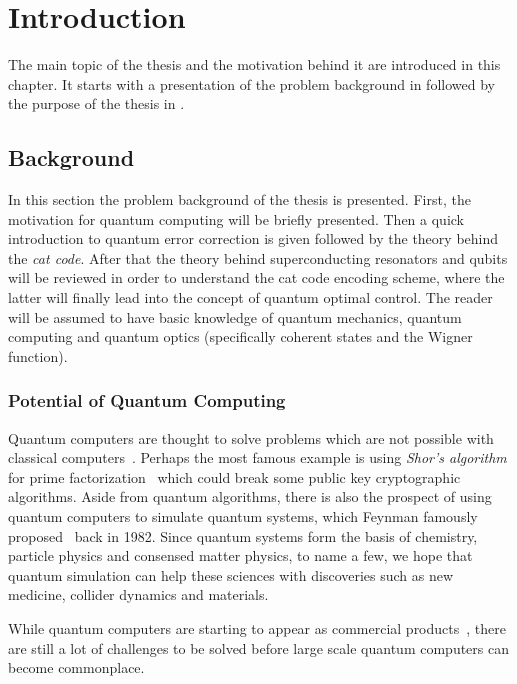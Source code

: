 \documentclass[main.tex]{subfiles}
\begin{document}
\chapter{Introduction}
The main topic of the thesis and the motivation behind it are introduced in this chapter.
It starts with a presentation of the problem background in  followed by the purpose of the thesis in .

\section{Background}%
\label{sec:background}
In this section the problem background of the thesis is presented.
First, the motivation for quantum computing will be briefly presented.
Then a quick introduction to quantum error correction is given followed by the theory behind the \emph{cat code}.
After that the theory behind superconducting resonators and qubits will be reviewed in order to understand the cat code encoding scheme, where the latter will finally lead into the concept of quantum optimal control.
The reader will be assumed to have basic knowledge of quantum mechanics, quantum computing and quantum optics (specifically coherent states and the Wigner function).

\subsection{Potential of Quantum Computing}
Quantum computers are thought to solve problems which are not possible with classical computers~\cite{preskill_quantum_2018}.
Perhaps the most famous example is using \emph{Shor's algorithm} for prime factorization~\cite{shor_polynomial-time_1997} which could break some public key cryptographic algorithms.
Aside from quantum algorithms, there is also the prospect of using quantum computers to simulate quantum systems, which Feynman famously proposed~\cite{feynman_simulating_1982} back in 1982.
Since quantum systems form the basis of chemistry, particle physics and consensed matter physics, to name a few, we hope that quantum simulation can help these sciences with discoveries such as new medicine, collider dynamics and materials.  

While quantum computers are starting to appear as commercial products~\cite{santos_ibm_2016}, there are still a lot of challenges to be solved before large scale quantum computers can become commonplace.
\end{document}
